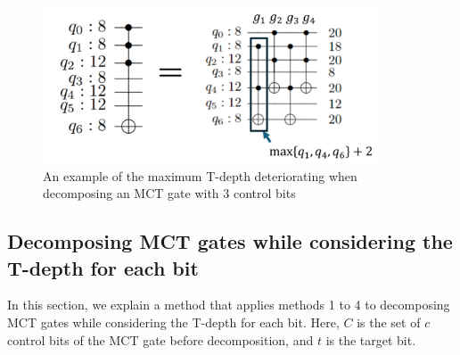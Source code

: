 \begin{figure}[tbp]
\centering
\includegraphics[width=10cm]{img/bad_consider_t-depth.pdf}
\caption{An example of the maximum T-depth deteriorating when decomposing an MCT gate with 3 control bits}
\label{bad_consider_tdepth}
\end{figure}
\subsection{Decomposing MCT gates while considering the T-depth for each bit}
In this section, we explain a method that applies methods 1 to 4 to decomposing MCT gates while considering the T-depth for each bit.
Here, $C$ is the set of $c$ control bits of the MCT gate before decomposition,
and $t$ is the target bit.
